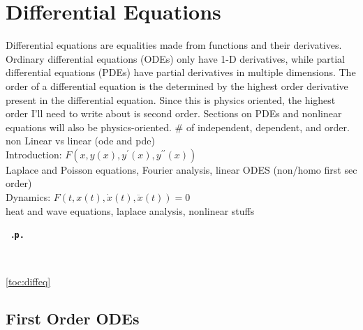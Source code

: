 %
%
\section{Differential Equations} 

Differential equations are equalities made from functions and their derivatives. Ordinary differential equations (ODEs) only have 1-D derivatives, while partial differential equations (PDEs) have partial derivatives in multiple dimensions. The order of a differential equation is the determined by the highest order derivative present in the differential equation. Since this is physics oriented, the highest order I'll need to write about is second order. Sections on PDEs and nonlinear equations will also be physics-oriented.
\# of independent, dependent, and order. 
non Linear vs linear (ode and pde)
\\
Introduction: $F
(x,y(x),y^\prime(x),y^{\prime\prime}(x))$\\
Laplace and Poisson equations, Fourier analysis, linear ODES (non/homo first sec order)\\
Dynamics: $F(t,x(t),\dot{x}(t),\ddot{x}(t))=0$\\
heat and wave equations, laplace analysis, nonlinear stuffs  
\par
\invisiblelocaltableofcontents\label{toc:diffeq}
\begingroup
    \parindent 0cm \parfillskip 0cm \leftskip 0cm \rightskip 0cm
                  {}
                  {\leavevmode\leftskip 0cm\relax} {\normalsize\bf\etocnumber~\rm\etocname\nobreak\leaders\hbox{.}\hfill\tt p.\makebox[12 pt][r]{\etocpage} \par}
                  {\vspace{-0.25cm}}
                  {}
                  {\leavevmode\leftskip 1cm\relax}
                  {\small\bf\etocnumber~\rm\etocname\par}
                  {}
    \tableofcontents\ref{toc:diffeq}
\endgroup\newpage
\subsection{First Order ODEs}

